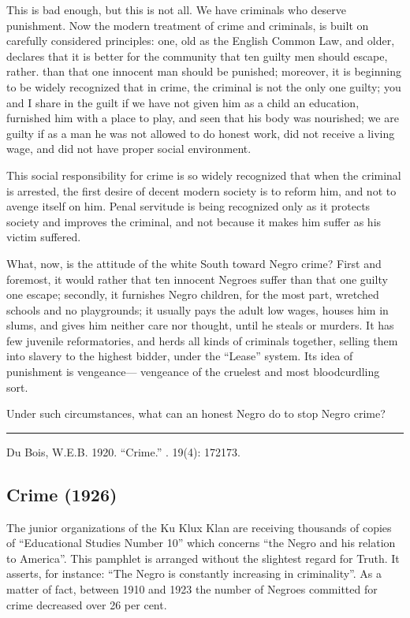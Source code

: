 \documentclass[letterpaper,10pt,english]{jupyterBook}
\begin{document}
\sphinxAtStartPar
This is bad enough, but this is not all. We have criminals who deserve punishment. Now the modern treatment of crime and criminals, is built on carefully considered principles: one, old as the English Common Law, and older, declares that it is better for the community that ten guilty men should escape, rather. than that one innocent man should be punished; moreover, it is beginning to be widely recognized that in crime, the criminal is not the only one guilty; you and I share in the guilt if we have not given him as a child an education, furnished him with a place to play, and seen that his body was nourished; we are guilty if as a man he was not allowed to do honest work, did not receive a living wage, and did not have proper social environment.

\sphinxAtStartPar
This social responsibility for crime is so widely recognized that when the criminal is arrested, the first desire of decent modern society is to reform him, and not to avenge itself on him. Penal servitude is being recognized only as it protects society and improves the criminal, and not because it makes him suffer as his victim suffered.

\sphinxAtStartPar
What, now, is the attitude of the white South toward Negro crime? First and foremost, it would rather that ten innocent Negroes suffer than that one guilty one escape; secondly, it furnishes Negro children, for the most part, wretched schools and no playgrounds; it usually pays the adult low wages, houses him in slums, and gives him neither care nor thought, until he steals or murders. It has few juvenile reformatories, and herds all kinds of criminals together, selling them into slavery to the highest bidder, under the “Lease” system. Its idea of punishment is vengeance— vengeance of the cruelest and most blood\sphinxhyphen{}curdling sort.

\sphinxAtStartPar
Under such circumstances, what can an honest Negro do to stop Negro crime?


\bigskip\hrule\bigskip


\sphinxAtStartPar
{} Du Bois, W.E.B. 1920. “Crime.” . 19(4): 172\sphinxhyphen{}173.


\subsection{Crime (1926)}
\label{\detokenize{Volumes/32/01/crime:crime-1926}}\label{\detokenize{Volumes/32/01/crime::doc}}
\sphinxAtStartPar
The junior organizations of the Ku Klux Klan are receiving thousands of copies of “Educational Studies Number 10” which concerns “the Negro and his relation to America”. This pamphlet is arranged without the slightest regard for Truth. It asserts, for instance: “The Negro is constantly increasing in criminality”. As a matter of fact, between 1910 and 1923 the number of Negroes committed for crime decreased over 26 per cent.
\end{document}
